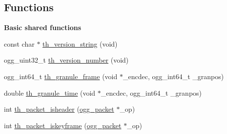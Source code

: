 \subsection*{Functions}
\begin{Indent}{\bf Basic shared functions}\par
\begin{DoxyCompactItemize}
\item 
const char $\ast$ \hyperlink{group__basefuncs_ga04846066738d9f2024fc9961162b2dbc}{th\+\_\+version\+\_\+string} (void)
\item 
ogg\+\_\+uint32\+\_\+t \hyperlink{group__basefuncs_gab723a75c0f95b3eb817f7f769846016b}{th\+\_\+version\+\_\+number} (void)
\item 
ogg\+\_\+int64\+\_\+t \hyperlink{group__basefuncs_ga95b10e76fc4c05d0240ea2dfd9fd62bd}{th\+\_\+granule\+\_\+frame} (void $\ast$\+\_\+encdec, ogg\+\_\+int64\+\_\+t \+\_\+granpos)
\item 
double \hyperlink{group__basefuncs_ga707e1e281de788af0df39ef00f3fb432}{th\+\_\+granule\+\_\+time} (void $\ast$\+\_\+encdec, ogg\+\_\+int64\+\_\+t \+\_\+granpos)
\item 
int \hyperlink{group__basefuncs_ga02f3f38261a9b39452d8a5e6f8737cc1}{th\+\_\+packet\+\_\+isheader} (\hyperlink{structogg__packet}{ogg\+\_\+packet} $\ast$\+\_\+op)
\item 
int \hyperlink{group__basefuncs_gafe95cfd06f0fef413266c9168a66248a}{th\+\_\+packet\+\_\+iskeyframe} (\hyperlink{structogg__packet}{ogg\+\_\+packet} $\ast$\+\_\+op)
\end{DoxyCompactItemize}
\end{Indent}

